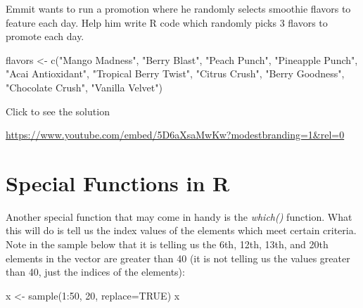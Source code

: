 \documentclass[
  letterpaper,
  DIV=11,
  numbers=noendperiod]{scrreprt}
\newenvironment{Shaded}{\begin{snugshade}}{\end{snugshade}}
\newcommand{\AttributeTok}[1]{\textcolor[rgb]{0.40,0.45,0.13}{#1}}
\newcommand{\ConstantTok}[1]{\textcolor[rgb]{0.56,0.35,0.01}{#1}}
\newcommand{\DecValTok}[1]{\textcolor[rgb]{0.68,0.00,0.00}{#1}}
\newcommand{\FunctionTok}[1]{\textcolor[rgb]{0.28,0.35,0.67}{#1}}
\newcommand{\NormalTok}[1]{\textcolor[rgb]{0.00,0.23,0.31}{#1}}
\newcommand{\OtherTok}[1]{\textcolor[rgb]{0.00,0.23,0.31}{#1}}
\newcommand{\SpecialCharTok}[1]{\textcolor[rgb]{0.37,0.37,0.37}{#1}}
\newcommand{\StringTok}[1]{\textcolor[rgb]{0.13,0.47,0.30}{#1}}
\begin{document}
\begin{tcolorbox}[enhanced jigsaw, colbacktitle=quarto-callout-tip-color!10!white, breakable, bottomrule=.15mm, colframe=quarto-callout-tip-color-frame, left=2mm, opacitybacktitle=0.6, title=\textcolor{quarto-callout-tip-color}{\faLightbulb}\hspace{0.5em}{Try it Out}, leftrule=.75mm, opacityback=0, rightrule=.15mm, titlerule=0mm, bottomtitle=1mm, colback=white, toprule=.15mm, arc=.35mm, toptitle=1mm, coltitle=black]

Emmit wants to run a promotion where he randomly selects smoothie
flavors to feature each day. Help him write R code which randomly picks
3 flavors to promote each day.

\begin{Shaded}
\begin{Highlighting}[]
\NormalTok{flavors }\OtherTok{\textless{}{-}} \FunctionTok{c}\NormalTok{(}\StringTok{"Mango Madness"}\NormalTok{, }\StringTok{"Berry Blast"}\NormalTok{, }\StringTok{"Peach Punch"}\NormalTok{, }\StringTok{"Pineapple Punch"}\NormalTok{, }
             \StringTok{"Acai Antioxidant"}\NormalTok{, }\StringTok{"Tropical Berry Twist"}\NormalTok{, }\StringTok{"Citrus Crush"}\NormalTok{, }
             \StringTok{"Berry Goodness"}\NormalTok{, }\StringTok{"Chocolate Crush"}\NormalTok{, }\StringTok{"Vanilla Velvet"}\NormalTok{)}
\end{Highlighting}
\end{Shaded}

Click to see the solution

\url{https://www.youtube.com/embed/5D6aXsaMwKw?modestbranding=1&rel=0}

\end{tcolorbox}

\section{Special Functions in R}\label{special-functions-in-r}

Another special function that may come in handy is the \emph{which()}
function. What this will do is tell us the index values of the elements
which meet certain criteria. Note in the sample below that it is telling
us the 6th, 12th, 13th, and 20th elements in the vector are greater than
40 (it is not telling us the values greater than 40, just the indices of
the elements):

\begin{Shaded}
\begin{Highlighting}[]
\NormalTok{x }\OtherTok{\textless{}{-}} \FunctionTok{sample}\NormalTok{(}\DecValTok{1}\SpecialCharTok{:}\DecValTok{50}\NormalTok{, }\DecValTok{20}\NormalTok{, }\AttributeTok{replace=}\ConstantTok{TRUE}\NormalTok{)}
\NormalTok{x}
\end{Highlighting}
\end{Shaded}
\end{document}
